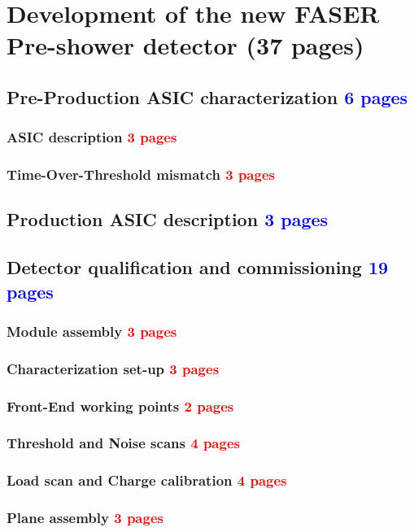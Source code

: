 \chapter{Development of the new FASER Pre-shower detector (37 pages)}
	\section{Pre-Production ASIC characterization \textcolor{blue}{ 6 pages}}
		\subsection{ASIC description \textcolor{red}{ 3 pages}} 
		\subsection{Time-Over-Threshold mismatch \textcolor{red}{ 3 pages}}

	\section{Production ASIC description \textcolor{blue}{ 3 pages}}
	\section{Detector qualification and commissioning \textcolor{blue}{ 19 pages}}
		\subsection{Module assembly \textcolor{red}{ 3 pages}}
		\subsection{Characterization set-up \textcolor{red}{ 3 pages}}
		\subsection{Front-End working points \textcolor{red}{ 2 pages}}
		\subsection{Threshold and Noise scans \textcolor{red}{ 4 pages}}
		\subsection{Load scan and Charge calibration \textcolor{red}{ 4 pages}} 
		\subsection{Plane assembly \textcolor{red}{ 3 pages}}

